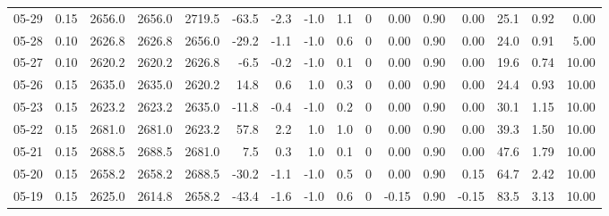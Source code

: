 \begin{threeparttable}
{\begin{tabular}{lrrrrrrrrrrrrrrr}
  05-29 &     0.15 & 2656.0 & 2656.0 & 2719.5 &      -63.5 &           -2.3 &                     -1.0 &                 1.1 &              0 &       0.00 &      0.90 &           0.00 &             25.1 &            0.92 &                   0.00 \\
  05-28 &     0.10 & 2626.8 & 2626.8 & 2656.0 &      -29.2 &           -1.1 &                     -1.0 &                 0.6 &              0 &       0.00 &      0.90 &           0.00 &             24.0 &            0.91 &                   5.00 \\
  05-27 &     0.10 & 2620.2 & 2620.2 & 2626.8 &       -6.5 &           -0.2 &                     -1.0 &                 0.1 &              0 &       0.00 &      0.90 &           0.00 &             19.6 &            0.74 &                  10.00 \\
  05-26 &     0.15 & 2635.0 & 2635.0 & 2620.2 &       14.8 &            0.6 &                      1.0 &                 0.3 &              0 &       0.00 &      0.90 &           0.00 &             24.4 &            0.93 &                  10.00 \\
  05-23 &     0.15 & 2623.2 & 2623.2 & 2635.0 &      -11.8 &           -0.4 &                     -1.0 &                 0.2 &              0 &       0.00 &      0.90 &           0.00 &             30.1 &            1.15 &                  10.00 \\
  05-22 &     0.15 & 2681.0 & 2681.0 & 2623.2 &       57.8 &            2.2 &                      1.0 &                 1.0 &              0 &       0.00 &      0.90 &           0.00 &             39.3 &            1.50 &                  10.00 \\
  05-21 &     0.15 & 2688.5 & 2688.5 & 2681.0 &        7.5 &            0.3 &                      1.0 &                 0.1 &              0 &       0.00 &      0.90 &           0.00 &             47.6 &            1.79 &                  10.00 \\
  05-20 &     0.15 & 2658.2 & 2658.2 & 2688.5 &      -30.2 &           -1.1 &                     -1.0 &                 0.5 &              0 &       0.00 &      0.90 &           0.15 &             64.7 &            2.42 &                  10.00 \\
  05-19 &     0.15 & 2625.0 & 2614.8 & 2658.2 &      -43.4 &           -1.6 &                     -1.0 &                 0.6 &              0 &      -0.15 &      0.90 &          -0.15 &             83.5 &            3.13 &                  10.00 \\

\end{tabular}}
\end{threeparttable}
